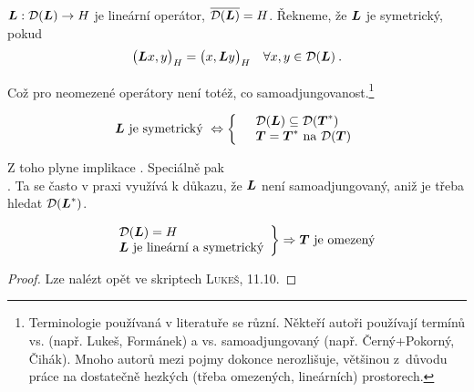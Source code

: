 \begin{definition}
$\boldsymbol{L} : \mathcal{D}(\boldsymbol{L}) \to H$ je lineární operátor, $\overline{\mathcal{D}(\boldsymbol{L})} = H $. Řekneme, že $\boldsymbol{L}$ je symetrický, pokud \begin{align*}
    \big( \boldsymbol{L} x, y \big)_H = \big( x, \boldsymbol{L} y \big)_H \quad \forall x,y \in \mathcal{D}(\boldsymbol{L}) \:.
\end{align*}
\end{definition}
Což pro neomezené operátory není totéž, co samoadjungovanost.\footnote{
Terminologie používaná v literatuře se různí. Někteří autoři používají termínů  vs.  (např. Lukeš, Formánek) a  vs. samoadjungovaný (např. Černý+Pokorný, Čihák). Mnoho autorů mezi pojmy dokonce nerozlišuje, většinou z~důvodu práce na dostatečně hezkých (třeba omezených, lineárních) prostorech.}
\begin{lemma}
    \begin{equation*}
    \begin{split}
        \boldsymbol{L} \text{ je symetrický }\Leftrightarrow\left \{
    \begin{array}{ll}
        &\mathcal{D}(\boldsymbol{L}) \subseteq \mathcal{D}(\boldsymbol{T}^*)\\
        &\boldsymbol{T}=\boldsymbol{T}^* \text{ na }\mathcal{D}(\boldsymbol{T})
    \end{array}
        \right.
    \end{split}
\end{equation*}
\end{lemma}
Z toho plyne implikace . Speciálně pak \\ . Ta se často v praxi využívá k důkazu, že $\boldsymbol{L}$ není samoadjungovaný, aniž je třeba hledat $\mathcal{D}(\boldsymbol{L}^*)$.

\begin{theorem}
    \begin{equation*}
    \begin{split}
        \left.
    \begin{array}{ll}
        &\mathcal{D}(\boldsymbol{L})=H\\
        &\boldsymbol{L} \text{ je lineární a symetrický}
    \end{array}
        \right \} \Rightarrow \boldsymbol{T} \text{ je omezený}
    \end{split}
\end{equation*}
\end{theorem}
\begin{proof}
Lze nalézt opět ve skriptech \textsc{Lukeš}, 11.10.
\end{proof}

